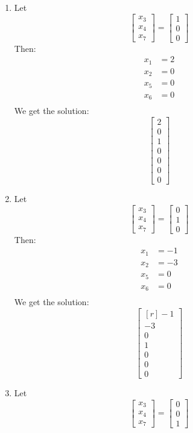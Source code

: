 \documentclass[12pt]{article}
\begin{document}
\begin{example}
\begin{enumerate}
\item Let
$$
\begin{bmatrix}x_3\\x_4\\x_7\end{bmatrix}=\begin{bmatrix}1\\0\\0\end{bmatrix}
$$
Then:
\begin{align*}
x_1&=2\\
x_2&=0\\
x_5&=0\\
x_6&=0\\
\end{align*}
We get the solution:
$$
\begin{bmatrix}2\\0\\1\\0\\0\\0\\0\end{bmatrix}
$$
\item  Let
$$
\begin{bmatrix}x_3\\x_4\\x_7\end{bmatrix}=\begin{bmatrix}0\\1\\0\end{bmatrix}
$$
Then:
\begin{align*}
x_1&=-1\\
x_2&=-3\\
x_5&=0\\
x_6&=0\\
\end{align*}
We get the solution:
$$
\begin{bmatrix*}[r]-1\\-3\\0\\1\\0\\0\\0\end{bmatrix*}
$$
\item Let
$$
\begin{bmatrix}x_3\\x_4\\x_7\end{bmatrix}=\begin{bmatrix}0\\0\\1\end{bmatrix}
$$
\end{enumerate}
\end{example}
\end{document}
